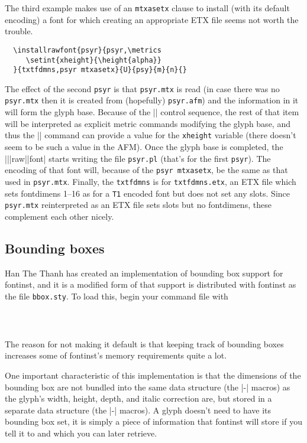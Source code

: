\documentclass[a4paper]{ltxguide}
\newcommand*{\meta}{\m}
\newcommand*{\setpackagename}[1]{\textsf{#1}}
\newcommand{\fontinst}{\setpackagename{font\-inst}\xspace}
\begin{document}
The third example makes use of an \texttt{mtxasetx} clause to install 
(with its default encoding) a font for which creating an appropriate 
ETX file seems not worth the trouble.
\begin{verbatim}
  \installrawfont{psyr}{psyr,\metrics 
     \setint{xheight}{\height{alpha}}
  }{txtfdmns,psyr mtxasetx}{U}{psy}{m}{n}{}
\end{verbatim}
The effect of the second \texttt{psyr} is that \texttt{psyr.mtx} is 
read (in case there was no \texttt{psyr.mtx} then it is created from 
(hopefully) \texttt{psyr.afm}) and the information in it will form 
the glyph base. Because of the |\metrics| control sequence, the rest 
of that item will be interpreted as explicit metric commands 
modifying the glyph base, and thus the |\setint| command can provide 
a value for the \texttt{xheight} variable (there doesn't seem to be 
such a value in the AFM). Once the glyph base is completed, the 
|\install|\-|raw|\-|font| starts writing the file \texttt{psyr.pl} 
(that's for the first \texttt{psyr}). The encoding of that font will, 
because of the \texttt{psyr mtxasetx}, be the same as that used in 
\texttt{psyr.mtx}. Finally, the \texttt{txtfdmns} is for 
\texttt{txtfdmns.etx}, an ETX file which sets fontdimens 1--16 as for 
a \texttt{T1} encoded font but does not set any slots. Since 
\texttt{psyr.mtx} reinterpreted as an ETX file sets slots but no 
fontdimens, these complement each other nicely.



\subsection{Bounding boxes}

Han The Thanh has created an implementation of bounding box support 
for \fontinst, and it is a modified form of that support 
is distributed with \fontinst as the file \texttt{bbox.sty}. To load 
this, begin your command file with
\begin{verbatim}
   
   
\end{verbatim}
The reason for not making it default is that keeping track of bounding 
boxes increases some of \fontinst's memory requirements quite a lot.

One important 
characteristic of this implementation is that the dimensions of the 
bounding box are not bundled into the same data structure (the 
|\g-|\meta{glyph} macros) as the glyph's width, height, depth, and 
italic correction are, but stored in a separate data structure (the 
|\gb-|\meta{glyph} macros). A glyph doesn't need to have its bounding 
box set, it is simply a piece of information that \fontinst 
will store if you tell it to and which you can later retrieve.
\end{document}
